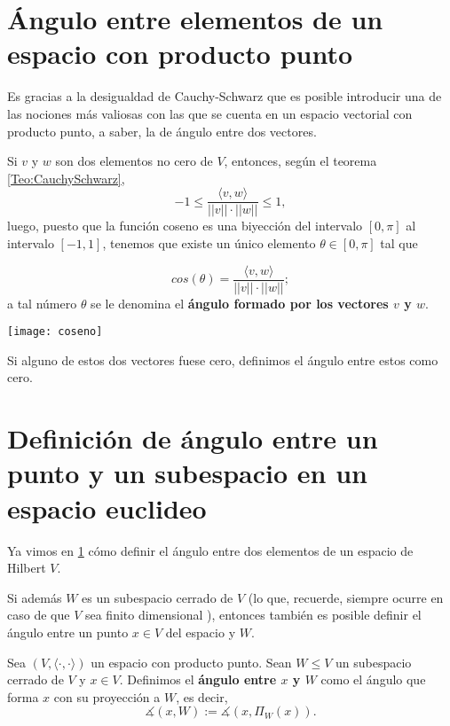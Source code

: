 \section{Ángulo entre elementos de un espacio con producto punto}
\label{angulo entre elementos de un espacio con producto punto}

Es gracias a la desigualdad de Cauchy-Schwarz
que es posible introducir una de las nociones
más valiosas con las que se cuenta en un espacio
vectorial con producto punto, a saber, la de ángulo entre dos
vectores.

Si $v$ y $w$ son dos elementos no cero de $V$, entonces,
según el teorema \ref{Teo:CauchySchwarz},
\[
-1 \leq \frac{\langle v, w \rangle}{||v|| \cdot ||w||} \leq 1,
\]
luego, puesto que la función coseno es una biyección
del intervalo $[0, \pi]$ al intervalo $[-1,1]$,
tenemos que existe un único elemento 
$\theta \in [0, \pi]$ tal que

\[
cos(\theta)= \frac{\langle v, w \rangle}{||v|| \cdot ||w||};
\]
a tal número $\theta$ se le denomina el 
\textbf{ángulo formado por los vectores $v$ y $w$}.

\begin{marginfigure}
\texttt{[image: coseno]}
\end{marginfigure}

Si alguno de estos dos vectores fuese cero, definimos
el ángulo entre estos como cero. 




\section{Definición de ángulo entre un punto y un subespacio en un espacio euclideo}

Ya vimos en \ref{angulo entre elementos de un espacio con producto punto}
cómo definir el ángulo entre dos elementos de un espacio
de Hilbert $V$.

Si además $W$ es un subespacio cerrado de $V$
(lo que, recuerde, siempre ocurre en caso de que
$V$ sea finito dimensional ), entonces también
es posible definir el ángulo entre un punto $x \in V$
del espacio y $W$.

\begin{defi} \label{def: angulo punto subespacio}
Sea $(V, \langle \cdot , \cdot \rangle)$ un espacio con 
producto punto. Sean $W \leq V$ un subespacio cerrado de $V$
y $x \in V$. Definimos el \textbf{ángulo entre $x$ y $W$}
como el ángulo que forma 
$x$ con su proyección a $W$, es decir,
\[
\measuredangle (x, W):= \measuredangle(x, \Pi_{W}(x)).
\]
\end{defi}

